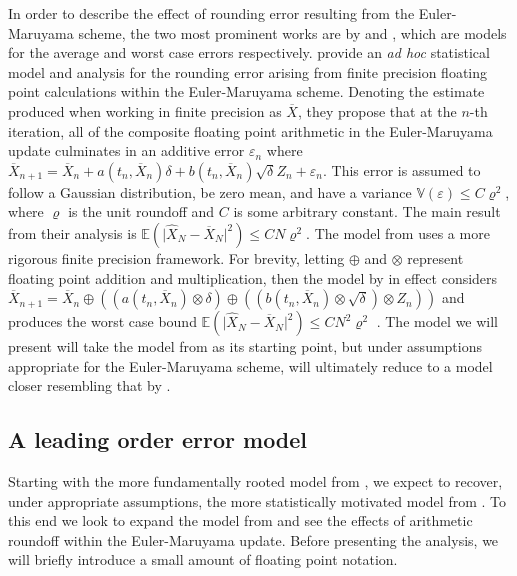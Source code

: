 \documentclass[9pt,a4paper,english]{extarticle}
\begin{document}
In order to describe the effect of rounding error resulting from the Euler-Maruyama scheme, the two most prominent works are by \citet{arciniega2003rounding} and \citet{omland2016mixed}, which are models for the average and worst case errors respectively. \citet{arciniega2003rounding} provide an \textit{ad hoc} statistical model and analysis for the rounding error arising from finite precision floating point calculations within the Euler-Maruyama scheme. Denoting the estimate produced when working in finite precision as $ \overline{X} $, they propose that at the $ n $-th iteration, all of the composite floating point arithmetic in the Euler-Maruyama update culminates in an additive error $ \varepsilon_n $ where
$ \overline{X}_{n+1} = \overline{X}_n + a(t_n, \overline{X}_n) \delta + b(t_n, \overline{X}_n)\sqrt{\delta} Z_n + \varepsilon_n $.
This error is assumed to follow a Gaussian distribution, be zero mean, and have a variance $ \mathbb{V}(\varepsilon) \leq C \varrho^2 $, where $ \varrho $ is the unit roundoff and $ C $ is some arbitrary constant. The main result from their analysis \citep[theorem~2.2]{arciniega2003rounding} is $ \mathbb{E}(\lvert \widehat{X}_N - \overline{X}_N \rvert^2) \leq  CN\varrho^2 $. The model from \citet{omland2016mixed} uses a more rigorous finite precision framework. For brevity, letting $ \oplus $ and $ \otimes $ represent floating point addition and multiplication, then the model by \citet{omland2016mixed} in effect considers $ \overline{X}_{n+1} = \overline{X}_n \oplus ((a(t_n, \overline{X}_n) \otimes \delta) \oplus ((b(t_n, \overline{X}_n)\otimes \sqrt{\delta})\otimes Z_n)) $ and produces the worst case bound $ \mathbb{E}(\lvert \widehat{X}_N - \overline{X}_N \rvert^2) \leq  CN^2\varrho^2 $ \citep[theorem~4.8]{omland2016mixed}. The model we will present will take the model from \citet{omland2016mixed} as its starting point, but under assumptions appropriate for the Euler-Maruyama scheme, will ultimately reduce to a model closer resembling that by \citet{arciniega2003rounding}.

\subsection{A leading order error model}
\label{sec:a_leading_order_error_model}

Starting with the more fundamentally rooted model from \citet{omland2016mixed}, we expect to recover, under appropriate assumptions, the more statistically motivated model from \citet{arciniega2003rounding}. To this end we look to expand the model from \citet{omland2016mixed} and see the effects of arithmetic roundoff within the Euler-Maruyama update. Before presenting the analysis, we will briefly introduce a small amount of floating point notation. 
\end{document}
